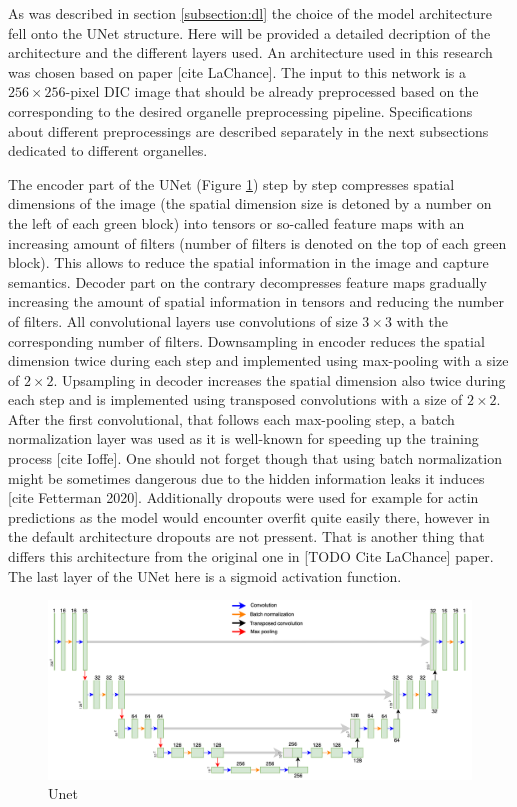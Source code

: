 As was described in section \ref{subsection:dl} the choice of the model architecture fell onto the UNet structure. Here will be provided a detailed decription of the architecture and the different layers used. An architecture used in this research was chosen based on paper [cite LaChance]. The input to this network is a $256 \times 256$-pixel DIC image that should be already preprocessed based on the corresponding to the desired organelle preprocessing pipeline. Specifications about different preprocessings are described separately in the next subsections dedicated to different organelles.

The encoder part of the UNet (Figure \ref{fig:unet}) step by step compresses spatial dimensions of the image (the spatial dimension size is detoned by a number on the left of each green block) into tensors or so-called feature maps with an increasing amount of filters (number of filters is denoted on the top of each green block). This allows to reduce the spatial information in the image and capture semantics. Decoder part on the contrary decompresses feature maps gradually increasing the amount of spatial information in tensors and reducing the number of filters. All convolutional layers use convolutions of size $3 \times 3$ with the corresponding number of filters. Downsampling in encoder reduces the spatial dimension twice during each step and implemented using max-pooling with a size of $2 \times 2$. Upsampling in decoder increases the spatial dimension also twice during each step and is implemented using transposed convolutions with a size of $2 \times 2$. After the first convolutional, that follows each max-pooling step, a batch normalization layer was used as it is well-known for speeding up the training process [cite Ioffe]. One should not forget though that using batch normalization might be sometimes dangerous due to the hidden information leaks it induces [cite Fetterman 2020]. Additionally dropouts were used for example for actin predictions as the model would encounter overfit quite easily there, however in the default architecture dropouts are not pressent. That is another thing that differs this architecture from the original one in [TODO Cite LaChance] paper. The last layer of the UNet here is a sigmoid activation function.
\begin{figure}[htb]
	\begin{center}
		\includegraphics[width=\linewidth]{bilder/Unet.png}
		\caption{Unet}\label{fig:unet}
	\end{center}
\end{figure}

